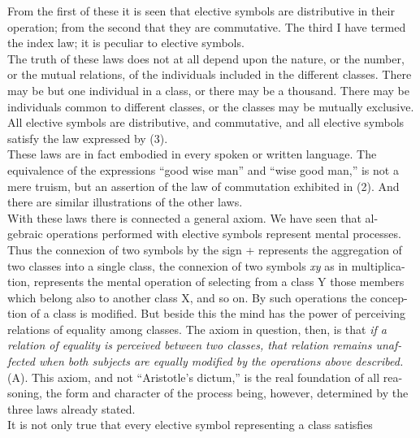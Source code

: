 \documentclass{article}
\begin{document}
{From the first of these it is seen that elective symbols are distributive in their
operation; from the second that they are commutative. The third I have termed
the index law; it is peculiar to elective symbols.\\ \vspace{.005in}
\hspace{.2in} The truth of these laws does not at all depend upon the nature, or the
number, or the mutual relations, of the individuals included in the different
classes. There may be but one individual in a class, or there may be a thousand.
There may be individuals common to different classes, or the classes may be
mutually exclusive. All elective symbols are distributive, and commutative, and
all elective symbols satisfy the law expressed by (3).\\ \vspace{.005in}
\hspace{.2in} These laws are in fact embodied in every spoken or written language. The
equivalence of the expressions “good wise man” and “wise good man,” is not a mere truism, but an assertion of the law of commutation exhibited in (2). And
there are similar illustrations of the other laws.\\ \vspace{.005in}
\hspace{.2in}
    With these laws there is connected a general axiom. We have seen that al-
gebraic operations performed with elective symbols represent mental processes.
Thus the connexion of two symbols by the sign + represents the aggregation of
two classes into a single class, the connexion of two symbols \textit{xy} as in multiplica-
tion, represents the mental operation of selecting from a class Y those members
which belong also to another class X, and so on. By such operations the concep-
tion of a class is modified. But beside this the mind has the power of perceiving
relations of equality among classes. The axiom in question, then, is that \textit{if a
relation of equality is perceived between two classes, that relation remains unaf-
fected when both subjects are equally modified by the operations above described.}
(A). This axiom, and not “Aristotle’s dictum,” is the real foundation of all rea-
soning, the form and character of the process being, however, determined by
the three laws already stated.\\ \vspace{.005in}
\hspace{.2in}
    It is not only true that every elective symbol representing a class satisfies
}
\end{document}
